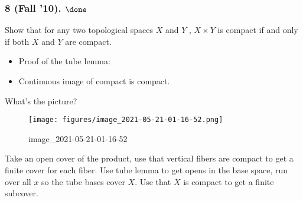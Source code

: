 \hypertarget{fall-10.-done}{%
\subsubsection{\texorpdfstring{8 (Fall '10).
\(\done\)}{8 (Fall '10). \textbackslash done}}\label{fall-10.-done}}

\begin{problem}[Fall 2010, 8]

Show that for any two topological spaces \(X\) and \(Y\) ,
\(X \times Y\) is compact if and only if both \(X\) and \(Y\) are
compact.

\end{problem}

\begin{concept}

\envlist

\begin{itemize}
\tightlist
\item
  Proof of the tube lemma:
\item
  Continuous image of compact is compact.
\end{itemize}

\end{concept}

\begin{strategy}

What's the picture?

\begin{figure}
\centering
\texttt{[image: figures/image\_2021-05-21-01-16-52.png]}
\caption{image\_2021-05-21-01-16-52}
\end{figure}

Take an open cover of the product, use that vertical fibers are compact
to get a finite cover for each fiber. Use tube lemma to get opens in the
base space, run over all \(x\) so the tube bases cover \(X\). Use that
\(X\) is compact to get a finite subcover.

\end{strategy}

